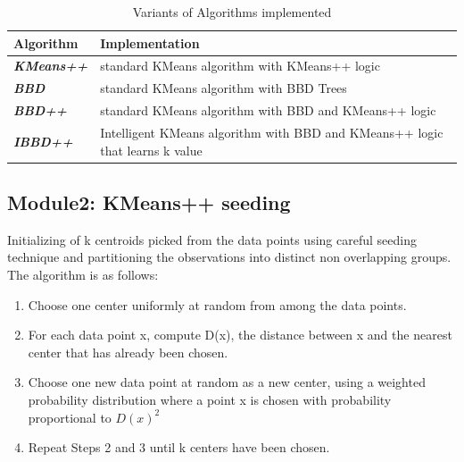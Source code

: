 \documentclass[conference]{IEEEtran}
\begin{document}
\begin{table}[h!]
\centering
\begin{tabular}{ |p{2cm}|p{6cm}|}
 \hline
Algorithm & Implementation\\
 \hline
 \textbf{\textit{KMeans++}}  & standard KMeans algorithm with KMeans++ logic  \\
 \hline
 \textbf{\textit{BBD}}  & standard KMeans algorithm with BBD Trees \\
 \hline
 \textbf{\textit{BBD++}}& standard KMeans algorithm with BBD and KMeans++ logic\\
 \hline
 \textbf{\textit{IBBD++}}& Intelligent KMeans algorithm with BBD and KMeans++ logic that learns k value\\
 \hline
\end{tabular}
\hspace{1mm}
\caption{Variants of Algorithms implemented}
\label{table:1}
\end{table}


\subsection{Module2: KMeans++ seeding}
Initializing of k centroids picked from the data points using careful seeding technique and partitioning the observations into distinct non overlapping groups.\\
The algorithm is as follows:
\begin{enumerate}
  \item Choose one center uniformly at random from among the data points.
  \item For each data point x, compute D(x), the distance between x and the nearest center that has already been chosen.
  \item Choose one new data point at random as a new center, using a weighted probability distribution where a point x is chosen with probability proportional to $D(x)^2$
  \item Repeat Steps 2 and 3 until k centers have been chosen.
\end{enumerate}
\end{document}
